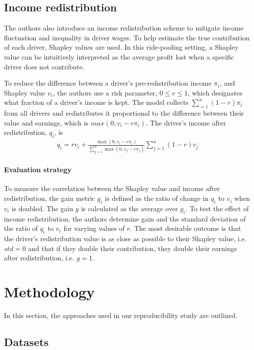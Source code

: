 \subsection{Income redistribution} \label{sec:income_redistribution}
The authors also introduce an income redistribution scheme to mitigate income fluctuation and inequality in driver wages. To help estimate the true contribution of each driver, Shapley values \cite{shapley} are used. In this ride-pooling setting, a Shapley value can be intuitively interpreted as the average profit lost when a specific driver does not contribute. 

To reduce the difference between a driver's pre-redistribution income $\pi_{i}$, and Shapley value $v_{i}$, the authors use a risk parameter, $0\leq r\leq 1$, which designates what fraction of a driver's income is kept. The model collects $\sum_{=1}^{n} (1-r)\pi_{i}$ from all drivers and redistributes it proportional to the difference between their value and earnings, which is $max(0, v_{i}-r\pi_{i})$. The driver's income after redistribution, $q_{i}$,  is 
\begin{align}\label{eq:q_i}
    q_{i} = rv_{i} +  \frac{\max(0, v_{i}-r\pi_{i})}{\sum_{j=1}^{n}\max(0, v_{j}-r\pi_{j})}\sum_{j=1}^{n}(1-r)v_{j}
\end{align}

\paragraph{Evaluation strategy}
To measure the correlation between the Shapley value and income after redistribution, the gain metric $g_{i}$ is defined as the ratio of change in $q_{i}$ to $v_{i}$ when $v_{i}$ is doubled. The gain $g$ is calculated as the average over $g_i$. To test the effect of income redistribution, the authors determine gain and the standard deviation of the ratio of $q_{i}$ to $v_{i}$ for varying values of $r$. The most desirable outcome is that the driver's redistribution value is as close as possible to their Shapley value, i.e. $std=0$ and that if they double their contribution, they double their earnings after redistribution, i.e. $g=1$.

\section{Methodology}\label{sec:Experimental setup}
In this section, the approaches used in our reproducibility study are outlined.

\subsection{Datasets}\label{sec:Datasets}

